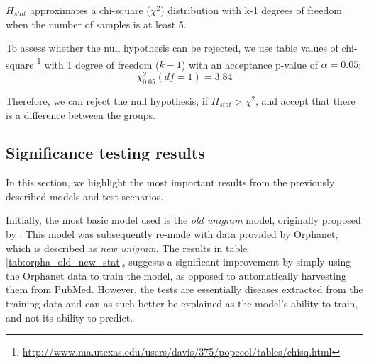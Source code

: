 \documentclass[10pt,letterpaper,final]{article}
\begin{document}
$H_{stat}$ approximates a chi-square ($\chi^2$) distribution with k-1
degrees of freedom when the number of samples is at least 5.

To assess whether the null hypothesis can be rejected, we use table
values of chi-square
\footnote{\url{http://www.ma.utexas.edu/users/davis/375/popecol/tables/chisq.html}}
with 1 degree of freedom ($k-1$) with an acceptance p-value of $\alpha
= 0.05$:
\[
\chi^2_{0.05}(df=1) = 3.84
\]




Therefore, we can reject the null hypothesis, if $H_{stat} > \chi^2$,
and accept that there is a difference between the groups.



\subsection{Significance testing results}
In this section, we highlight the most important results from the
previously described models and test scenarios.

Initially, the most basic model used is the \textit{old unigram} model,
originally proposed by \cite{jensenandersen}. This model was
subsequently re-made with data provided by Orphanet, which is described
as \textit{new unigram}. The results in table \ref{tab:orpha_old_new_stat},
suggests a significant improvement by simply using the Orphanet data to
train the model, as opposed to automatically harvesting them from
PubMed. However, the tests are essentially diseases extracted from the
training data and can as such better be explained as the model's ability
to train, and not its ability to predict.
\end{document}
